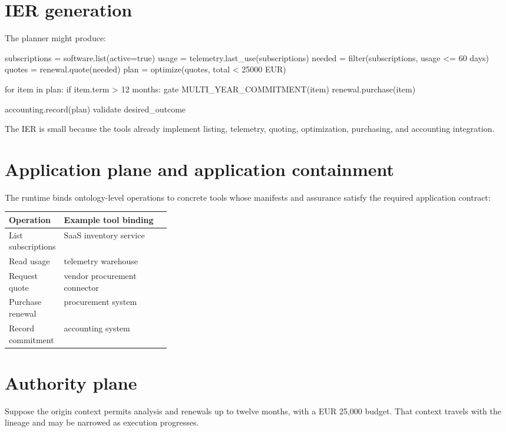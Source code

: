 \documentclass[10pt,oneside,openany]{book}
\begin{document}
\section{IER generation}
The planner might produce:

\begin{codeblock}
subscriptions = software.list(active=true)
usage = telemetry.last_use(subscriptions)
needed = filter(subscriptions, usage <= 60 days)
quotes = renewal.quote(needed)
plan = optimize(quotes, total < 25000 EUR)

for item in plan:
  if item.term > 12 months:
    gate MULTI_YEAR_COMMITMENT(item)
  renewal.purchase(item)

accounting.record(plan)
validate desired_outcome
\end{codeblock}

The IER is small because the tools already implement listing, telemetry, quoting, optimization, purchasing, and accounting integration.

\section{Application plane and application containment}
The runtime binds ontology-level operations to concrete tools whose manifests and assurance satisfy the required application contract:

\begin{center}
\begin{tabularx}{0.95\linewidth}{>{\sffamily\small}p{0.32\linewidth} X}
\toprule
Operation & Example tool binding \\
\midrule
List subscriptions & SaaS inventory service \\
Read usage & telemetry warehouse \\
Request quote & vendor procurement connector \\
Purchase renewal & procurement system \\
Record commitment & accounting system \\
\bottomrule
\end{tabularx}
\end{center}

\section{Authority plane}
Suppose the origin context permits analysis and renewals up to twelve months, with a EUR 25,000 budget. That context travels with the lineage and may be narrowed as execution progresses.
\end{document}
